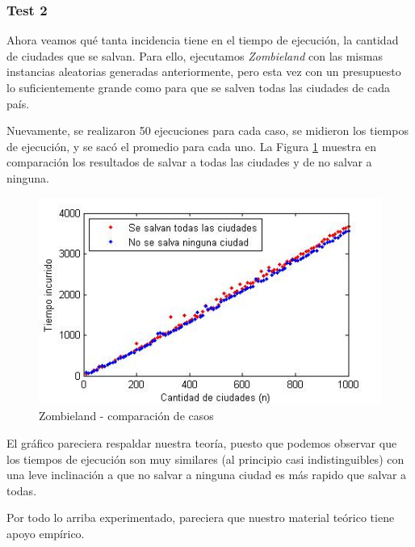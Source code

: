 \vspace*{0.6cm}
\subsubsection{Test 2}

\vspace*{0.3cm}

Ahora veamos qué tanta incidencia tiene en el tiempo de ejecución, la cantidad de ciudades que se salvan.  Para ello, ejecutamos {\it Zombieland} con las mismas instancias aleatorias generadas anteriormente, pero esta vez con un presupuesto lo suficientemente grande como para que se salven todas las ciudades de cada país.

Nuevamente, se realizaron 50 ejecuciones para cada caso, se midieron los tiempos de ejecución, y se sacó el promedio para cada uno.  La Figura \ref{fig:1-comp} muestra en comparación los resultados de salvar a todas las ciudades y de no salvar a ninguna.

\begin{figure}[htb]
	\begin{center}
    		\includegraphics[scale=0.5]{imagenes/1-comparacion.jpg}
	\end{center}
	\caption{Zombieland - comparación de casos}\label{fig:1-comp}
\end{figure}

El gráfico pareciera respaldar nuestra teoría, puesto que podemos observar que los tiempos de ejecución son muy similares (al principio casi indistinguibles) con una leve inclinación a que no salvar a ninguna ciudad es más rapido que salvar a todas.

Por todo lo arriba experimentado, pareciera que nuestro material teórico tiene apoyo empírico.
